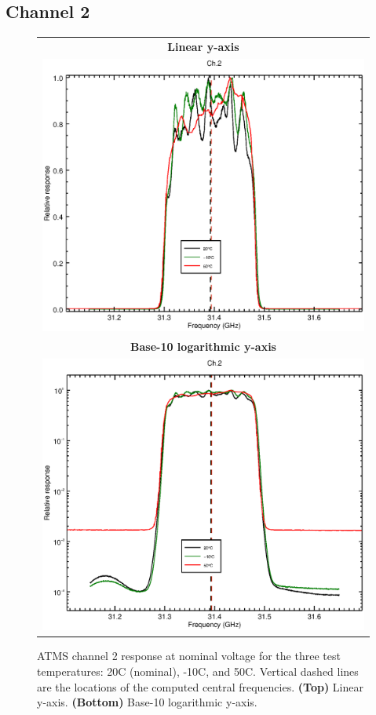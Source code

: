 \subsection{Channel 2}
\begin{figure}[H]
  \label{fig:Tset.ch2_response}
  \centering
  \begin{tabular}{c}
    \hspace{1.75cm}\sffamily\textbf{Linear y-axis} \\
    \includegraphics[scale=0.55]{graphics/srf/Tset/lin/atms_npp-2.eps} \\
    \hspace{1.75cm}\sffamily\textbf{Base-10 logarithmic y-axis} \\
    \includegraphics[scale=0.55]{graphics/srf/Tset/log/atms_npp-2.eps}
  \end{tabular}
  \caption{ATMS channel 2 response at nominal voltage for the three test temperatures: 20\textdegree{}C (nominal), -10\textdegree{}C, and 50\textdegree{}C. Vertical dashed lines are the locations of the computed central frequencies. \textbf{(Top)} Linear y-axis. \textbf{(Bottom)} Base-10 logarithmic y-axis.}
\end{figure}

